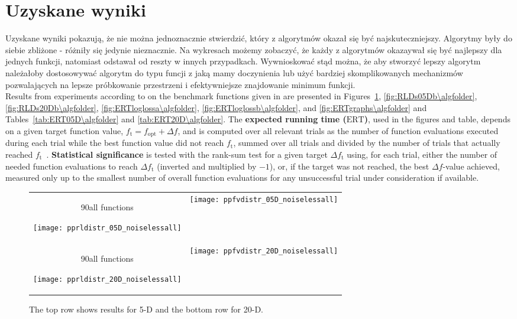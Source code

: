 \documentclass{article}
\newcommand{\ERT}{\ensuremath{\mathrm{ERT}}}
\newcommand{\Df}{\ensuremath{\Delta f}}
\newcommand{\fopt}{\ensuremath{f_\mathrm{opt}}}
\newcommand{\ftarget}{\ensuremath{f_\mathrm{t}}}
\newcommand{\rot}[2][2.5]{
  \hspace*{-3.5\baselineskip}%
  \begin{rotate}{90}\hspace{#1em}#2
  \end{rotate}}
\begin{document}
\section{Uzyskane wyniki}
Uzyskane wyniki pokazują, że nie można jednoznacznie stwierdzić, który z algorytmów okazał się być najskuteczniejszy. Algorytmy były do siebie zbliżone - różniły się jedynie nieznacznie. Na wykresach możemy zobaczyć, że każdy z algorytmów okazaywał się być najlepszy dla jednych funkcji, natomiast odstawał od reszty w innych przypadkach. Wywnioskować stąd można, że aby stworzyć lepszy algorytm należałoby dostosowywać algorytm do typu funcji z jaką mamy doczynienia lub użyć bardziej skomplikowanych mechanizmów pozwalających na lepsze próbkowanie przestrzeni i efektywniejsze znajdowanie minimum funkcji.\\
Results from experiments according to \cite{hansen2010exp} on the
benchmark functions given in \cite{wp200901_2010,hansen2010fun} are presented
in Figures~\ref{fig:RLDs05Da\algfolder}, \ref{fig:RLDs05Db\algfolder},
\ref{fig:RLDs20Db\algfolder},
\ref{fig:ERTloglossa\algfolder}, \ref{fig:ERTloglossb\algfolder},
and \ref{fig:ERTgraphs\algfolder} and 
Tables~\ref{tab:ERT05D\algfolder} and \ref{tab:ERT20D\algfolder}.
The \textbf{expected running time (\ERT)}, used in the figures and table,
depends on a given target function value, $\ftarget=\fopt+\Df$, and is computed
over all relevant trials as the number of function evaluations executed during
each trial while the best function value did not reach \ftarget, summed over
all trials and divided by the number of trials that actually reached \ftarget\
\cite{hansen2010exp,price1997dev}.
\textbf{Statistical significance} is tested with the rank-sum test for a given
target $\Delta\ftarget$ using, for each trial, either the number of needed
function evaluations to reach $\Delta\ftarget$ (inverted and multiplied by
$-1$), or, if the target was not reached, the best $\Df$-value achieved,
measured only up to the smallest number of overall function evaluations for any
unsuccessful trial under consideration if available.
\begin{figure}[htbp!]
\centering
\begin{tabular}{@{}c@{}c@{}}
\rot[5]{all functions}\texttt{[image: pprldistr\_05D\_noiselessall]} &
\texttt{[image: ppfvdistr\_05D\_noiselessall]}\\
\rot[5]{all functions}\texttt{[image: pprldistr\_20D\_noiselessall]} &
\texttt{[image: ppfvdistr\_20D\_noiselessall]}
\end{tabular}
\caption{\label{fig:RLDs05Da\algfolder} \bbobpprldistrlegend{} The top row shows results for 5-D and the bottom row for 20-D.}
\end{figure}
\end{document}

